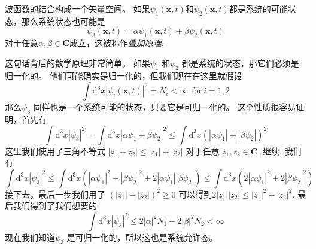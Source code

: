  波函数的结合构成一个矢量空间。 如果$\psi_1(\mathbf{x},t)$和$\psi_2(\mathbf{x},t)$都是系统的可能状态，那么系统状态也可能是
\[
    \psi_3(\mathbf{x},t)=\alpha\psi_1(\mathbf{x},t) +\beta\psi_2(\mathbf{x},t) 
\]
对于任意$\alpha, \beta \in \mathbf{C}$成立，这被称作\textit{叠加原理}.\par
这句话背后的数学原理非常简单。 如果$\psi_1$ 和$\psi_2$ 都是系统的状态，那它们必须是归一化的。 他们可能确实是归一化的，但我们现在在这里就假设
\[
    \int \mathrm{d}^3 x|\psi_i(\mathbf{x},t)|^2=N_i<\infty \ \ \mathrm{for}\ i=1,2
\]
那么$\psi_3$ 同样也是一个系统可能的状态，只要它是可归一化的。 这个性质很容易证明，首先有
\[
\int \mathrm{d}^3 x|\psi_3|^2=\int\mathrm{d}^3 x|\alpha\psi_1+\beta\psi_2|^2\le\int\mathrm{d}^3x \left(|\alpha\psi_1|+|\beta\psi_2|\right)^2
\]
这里我们使用了三角不等式 $|z_1 + z_2| \le |z_1| + |z_2|$ 对于任意 $z_1, z_2 \in \mathbf{C}$. 继续, 我们有
\[
\int \mathrm{d}^3 x|\psi_3|^2\le\int \mathrm{d}^3 x\left(|\alpha\psi_1|^2+|\beta\psi_2|^2+2|\alpha\psi_1||\beta\psi_2| \right)\le\int \mathrm{d}^3 x\left(2|\alpha\psi_1|^2+2|\beta\psi_2|^2\right)
\]
接下去，最后一步我们用了 $(|z_1|−|z_2|)^2 \ge 0$ 可以得到$2|z_1||z_2| \le |z_1|^2 + |z_2|^2$. 最后我们得到了我们想要的
\[
\int \mathrm{d}^3 x|\psi_3|^2\le 2|\alpha|^2N_1+2|\beta|^2 N_2<\infty
\]
 现在我们知道$\psi_3$ 是可归一化的，所以这也是系统允许态。\par
